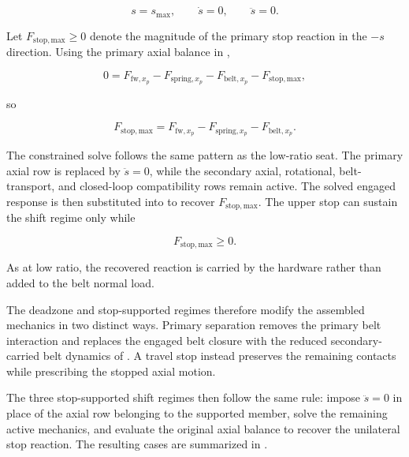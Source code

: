 \documentclass[11pt]{report}
\numberwithin{equation}{section}
\begin{document}
\begin{equation}
    s=s_{\max},
    \qquad
    \dot s=0,
    \qquad
    \ddot s=0.
    \label{eq:upper_stop_kinematics}
\end{equation}

Let \(F_{\mathrm{stop,max}}\geq0\) denote the magnitude of the primary stop
reaction in the \(-s\) direction. Using the primary axial balance in
,

\begin{equation}
    0
    =
    F_{\mathrm{fw},x_p}
    -
    F_{\mathrm{spring},x_p}
    -
    F_{\mathrm{belt},x_p}
    -
    F_{\mathrm{stop,max}},
    \label{eq:upper_stop_balance}
\end{equation}

so

\begin{equation}
    F_{\mathrm{stop,max}}
    =
    F_{\mathrm{fw},x_p}
    -
    F_{\mathrm{spring},x_p}
    -
    F_{\mathrm{belt},x_p}.
    \label{eq:upper_stop_reaction}
\end{equation}

The constrained solve follows the same pattern as the low-ratio seat. The
primary axial row is replaced by \(\ddot s=0\), while the secondary axial,
rotational, belt-transport, and closed-loop compatibility rows remain active.
The solved engaged response is then substituted into
 to recover \(F_{\mathrm{stop,max}}\). The upper
stop can sustain the shift regime only while

\begin{equation}
    F_{\mathrm{stop,max}}\geq0.
    \label{eq:upper_stop_admissibility}
\end{equation}

As at low ratio, the recovered reaction is carried by the hardware rather
than added to the belt normal load.

The deadzone and stop-supported regimes therefore modify the assembled
mechanics in two distinct ways. Primary separation removes the primary belt
interaction and replaces the engaged belt closure with the reduced
secondary-carried belt dynamics of
. A travel stop instead preserves the
remaining contacts while prescribing the stopped axial motion.

The three stop-supported shift regimes then follow the same rule: impose
\(\ddot s=0\) in place of the axial row belonging to the supported member,
solve the remaining active mechanics, and evaluate the original axial balance
to recover the unilateral stop reaction. The resulting cases are summarized
in .
\end{document}

